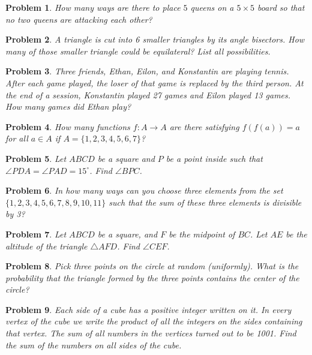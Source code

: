 \documentclass[a4paper,12pt]{article}
\theoremstyle{perfect}
\newtheorem{prb}{Problem}
\begin{document}
\begin{prb}
How many ways are there to place $5$ queens on a $5 \times 5$ board so that no two queens are attacking each other?
\end{prb}

\begin{prb}
A triangle is cut into 6 smaller triangles by its angle bisectors. How many of those smaller triangle could be equilateral? List all possibilities. 
\end{prb}

\begin{prb}
Three friends, Ethan, Eilon, and Konstantin are playing tennis. After each game played, the loser of that game is replaced by the third person. At the end of a session, Konstantin played 27 games and Eilon played 13 games. How many games did Ethan play?
\end{prb}

\begin{prb}
How many functions $f : A \to A$ are there satisfying $f(f(a)) = a$ for all $a \in A$ if $A = \{1,2,3,4,5,6,7\}$?
\end{prb} 


\begin{prb}
Let $ABCD$ be a square and $P$ be a point inside such that $\angle PDA = \angle PAD = 15^\circ$. Find $\angle BPC$.
\end{prb}


\begin{prb}
In how many ways can you choose three elements from the set $\{1,2,3,4,5,6,7,8,9,10,11\}$ such that the sum of these three elements is divisible by 3?
\end{prb}

\begin{prb}
Let $ABCD$ be a square, and $F$ be the midpoint of $BC$. Let $AE$ be the altitude of the triangle $\triangle AFD$. Find $\angle CEF$.
\end{prb} 

\begin{prb}
Pick three points on the circle at random (uniformly). What is the probability that the triangle formed by the three points contains the center of the circle?
\end{prb}

\begin{prb}
Each side of a cube has a positive integer written on it. In every vertex of the cube we write the product of all the integers on the sides containing that vertex. The sum of all numbers in the vertices turned out to be 1001. Find the sum of the numbers on all sides of the cube.
\end{prb} 
\end{document}
